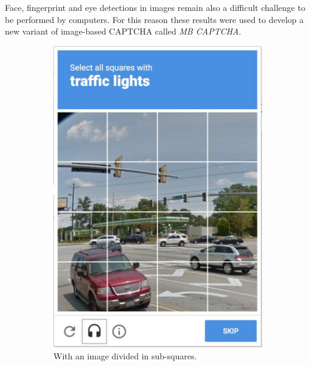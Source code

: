 \begin{itemize}
{Face, fingerprint and eye detections in images remain also a difficult challenge to be performed by computers. For this reason these results were used to develop a new variant of image-based CAPTCHA called \textit{MB CAPTCHA}\cite{MB_CAPTCHA}.
\begin{figure}[h]
     \centering
     \begin{subfigure}[b]{0.48\textwidth}
         \centering
         \includegraphics[width=.75\linewidth]{Images/StateOfArt/image_CAPTCHA}
         \caption{\footnotesize{With an image divided in sub-squares.}}
         \label{soa:image}
     \end{subfigure}
     \hfill
     \begin{subfigure}[b]{0.48\textwidth}
         \centering

\end{subfigure}
\end{figure}}
\end{itemize}
